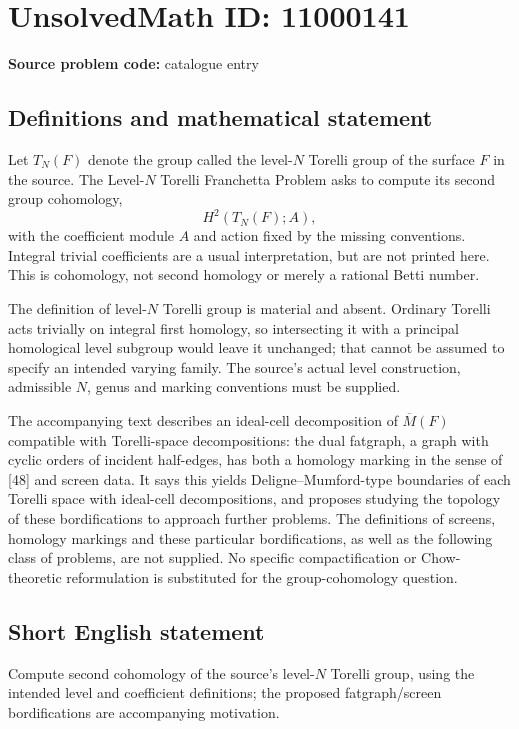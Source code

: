 \documentclass[11pt]{article}
\begin{document}
\section*{UnsolvedMath ID: 11000141}
\textbf{Source problem code:} catalogue entry
\subsection{Definitions and mathematical statement}
Let \(T_N(F)\) denote the group called the level-\(N\) Torelli group of the surface \(F\) in the source. The Level-\(N\) Torelli Franchetta Problem asks to compute its second group cohomology,
\[
 H^2(T_N(F);A),
\]
with the coefficient module \(A\) and action fixed by the missing conventions. Integral trivial coefficients are a usual interpretation, but are not printed here. This is cohomology, not second homology or merely a rational Betti number.

The definition of level-\(N\) Torelli group is material and absent. Ordinary Torelli acts trivially on integral first homology, so intersecting it with a principal homological level subgroup would leave it unchanged; that cannot be assumed to specify an intended varying family. The source's actual level construction, admissible \(N\), genus and marking conventions must be supplied.

The accompanying text describes an ideal-cell decomposition of \(\overline{M}(F)\) compatible with Torelli-space decompositions: the dual fatgraph, a graph with cyclic orders of incident half-edges, has both a homology marking in the sense of [48] and screen data. It says this yields Deligne--Mumford-type boundaries of each Torelli space with ideal-cell decompositions, and proposes studying the topology of these bordifications to approach further problems. The definitions of screens, homology markings and these particular bordifications, as well as the following class of problems, are not supplied. No specific compactification or Chow-theoretic reformulation is substituted for the group-cohomology question.
\subsection{Short English statement}
Compute second cohomology of the source's level-\(N\) Torelli group, using the intended level and coefficient definitions; the proposed fatgraph/screen bordifications are accompanying motivation.
\end{document}

